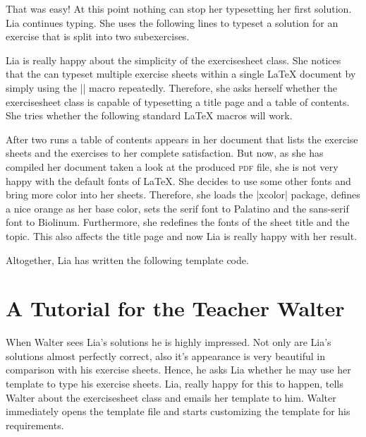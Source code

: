 \documentclass[a4paper,fleqn,9pt]{report}
\def\exercisesheet{{exercisesheet}}
\begin{document}
That was easy! At this point nothing can stop her typesetting her
first solution. Lia continues typing. She uses the following lines to
typeset a solution for an exercise that is split into two
subexercises.



Lia is really happy about the simplicity of the \exercisesheet{}
class. She notices that the can typeset multiple exercise sheets
within a single \LaTeX{} document by simply using the
|\sheet| macro repeatedly. Therefore, she asks herself
whether the \exercisesheet{} class is capable of typesetting a
title page and a table of contents. She tries whether the following
standard \LaTeX{} macros will work.



After two runs a table of contents appears in her document that lists
the exercise sheets and the exercises to her complete satisfaction.
But now, as she has compiled her document taken a look at the produced
\textsc{pdf} file, she is not very happy with the default fonts of
\LaTeX{}. She decides to use some other fonts and bring more color
into her sheets. Therefore, she loads the |xcolor| package,
defines a nice orange as her base color, sets the serif font to
Palatino and the sans-serif font to Biolinum. Furthermore, she
redefines the fonts of the sheet title and the topic. This also
affects the title page and now Lia is really happy with her result.


Altogether, Lia has written the following template code.




\section{A Tutorial for the Teacher Walter}

When Walter sees Lia's solutions he is highly impressed. Not only are
Lia's solutions almost perfectly correct, also it's appearance is very
beautiful in comparison with his exercise sheets.  Hence, he asks Lia
whether he may use her template to type his exercise sheets. Lia,
really happy for this to happen, tells Walter about the
\exercisesheet{} class and emails her template to him. Walter
immediately opens the template file and starts customizing the
template for his requirements.
\end{document}
